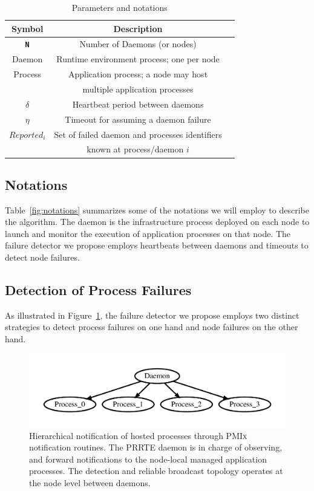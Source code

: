 \documentclass[sigconf]{acmart}
\newcommand{\prrte}[0]{\textsc{PRRTE}\xspace}
\newcommand{\pmix}[0]{\textsc{PMIx}\xspace}
\begin{document}
\begin{table}
  \caption{Parameters and notations}\label{fig:notations}
  \label{tab:parameters}
  \small
  \begin{tabular}{ccl}
    \toprule
    Symbol & Description \\
    \midrule
    \texttt{\bf N} & Number of Daemons (or nodes) \\
    Daemon & Runtime environment process; one per node\\
    Process & Application process; a node may host \\& multiple application processes \\
    $\delta$ & Heartbeat period between daemons\\
    $\eta$ & Timeout for assuming a daemon failure\\
    $Reported_i$ & Set of failed daemon and processes identifiers\\
                 & known at process/daemon $i$ \\
    \bottomrule
  \end{tabular}
\end{table}

\subsection{Notations}

Table~\ref{fig:notations} summarizes some of the notations we will employ 
to describe the algorithm. The daemon is the infrastructure 
process deployed on each node to launch and monitor the execution of application 
processes on that node. The failure detector we propose employs heartbeats 
between daemons and timeouts to detect node failures.

\subsection{Detection of Process Failures}

As illustrated in Figure~\ref{fig:hosted}, the failure detector we propose 
employs two distinct strategies to detect process failures on one hand 
and node failures on the other hand. 

\begin{figure}[h]
  \centering
  \includegraphics[width=\linewidth]{server_client.pdf}
  \caption{Hierarchical notification of hosted processes through \pmix notification routines. The \prrte daemon is in charge of observing, and forward notifications to the node-local managed application processes. The detection and reliable broadcast 
  topology operates at the node level between daemons.}\label{fig:hosted}
\end{figure}
\end{document}
